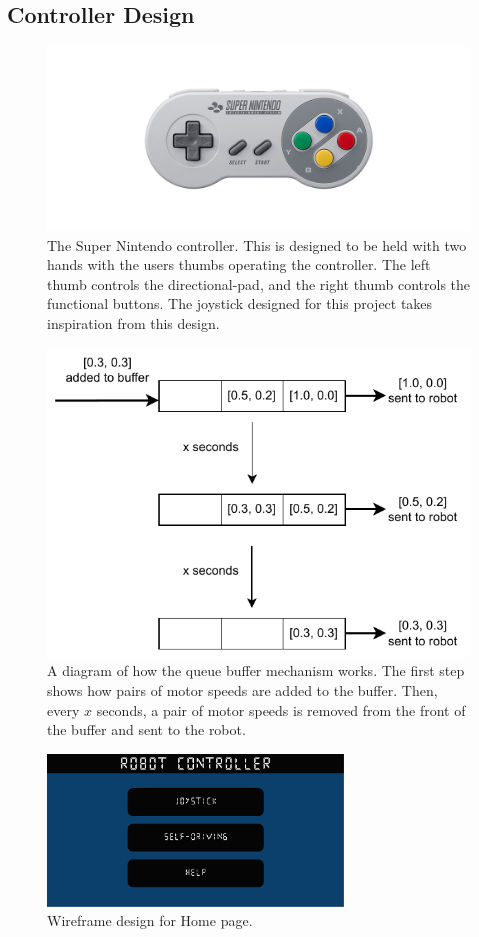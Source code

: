 \documentclass{l4proj}
\begin{document}
\begin{appendices}
\chapter{Controller Design}\label{sec:controller-design-appendix}

\begin{figure}[!ht]
    \centering
    \includegraphics[width=0.85\linewidth]{images/nintendo-controller.jpg}
    \caption{The Super Nintendo controller. This is designed to be held with two hands with the users thumbs operating the controller. The left thumb controls the directional-pad, and the right thumb controls the functional buttons. The joystick designed for this project takes inspiration from this design.}
    \label{fig:nintendo-controller}
\end{figure}

\begin{figure}[!ht]
    \centering
    \includegraphics[width=0.6\linewidth]{images/buffer.pdf}
    \caption{A diagram of how the queue buffer mechanism works. The first step shows how pairs of motor speeds are added to the buffer. Then, every $x$ seconds, a pair of motor speeds is removed from the front of the buffer and sent to the robot.}
    \label{fig:buffer}
\end{figure}

\begin{figure}[!ht]
    \centering
    \includegraphics[width=0.7\textwidth]{images/home-page-wireframe.pdf}
    \caption{Wireframe design for Home page.}
    \label{fig:home-page-wireframe} 
\end{figure}


\end{appendices}
\end{document}
